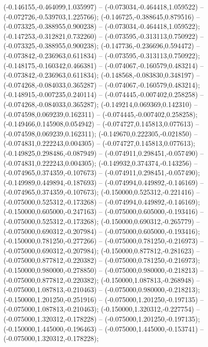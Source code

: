  (-0.146155,-0.464099,1.035997) -- (-0.073034,-0.464418,1.059522) -- (-0.072726,-0.539703,1.225766);
 (-0.146725,-0.388645,0.879516) -- (-0.073325,-0.388955,0.900238) -- (-0.073034,-0.464418,1.059522);
 (-0.147253,-0.312821,0.732260) -- (-0.073595,-0.313113,0.750922) -- (-0.073325,-0.388955,0.900238);
 (-0.147736,-0.236696,0.594472) -- (-0.073842,-0.236963,0.611834) -- (-0.073595,-0.313113,0.750922);
 (-0.148175,-0.160342,0.466381) -- (-0.074067,-0.160579,0.483214) -- (-0.073842,-0.236963,0.611834);
 (-0.148568,-0.083830,0.348197) -- (-0.074268,-0.084033,0.365287) -- (-0.074067,-0.160579,0.483214);
 (-0.148915,-0.007235,0.240114) -- (-0.074445,-0.007402,0.258258) -- (-0.074268,-0.084033,0.365287);
 (-0.149214,0.069369,0.142310) -- (-0.074598,0.069239,0.162311) -- (-0.074445,-0.007402,0.258258);
 (-0.149466,0.145908,0.054942) -- (-0.074727,0.145813,0.077613) -- (-0.074598,0.069239,0.162311);
 (-0.149670,0.222305,-0.021850) -- (-0.074831,0.222243,0.004305) -- (-0.074727,0.145813,0.077613);
 (-0.149825,0.298486,-0.087949) -- (-0.074911,0.298451,-0.057490) -- (-0.074831,0.222243,0.004305);
 (-0.149932,0.374374,-0.143256) -- (-0.074965,0.374359,-0.107673) -- (-0.074911,0.298451,-0.057490);
 (-0.149989,0.449894,-0.187693) -- (-0.074994,0.449892,-0.146169) -- (-0.074965,0.374359,-0.107673);
 (-0.150000,0.525312,-0.221416) -- (-0.075000,0.525312,-0.173268) -- (-0.074994,0.449892,-0.146169);
 (-0.150000,0.605000,-0.247163) -- (-0.075000,0.605000,-0.193416) -- (-0.075000,0.525312,-0.173268);
 (-0.150000,0.690312,-0.265779) -- (-0.075000,0.690312,-0.207984) -- (-0.075000,0.605000,-0.193416);
 (-0.150000,0.781250,-0.277266) -- (-0.075000,0.781250,-0.216973) -- (-0.075000,0.690312,-0.207984);
 (-0.150000,0.877812,-0.281623) -- (-0.075000,0.877812,-0.220382) -- (-0.075000,0.781250,-0.216973);
 (-0.150000,0.980000,-0.278850) -- (-0.075000,0.980000,-0.218213) -- (-0.075000,0.877812,-0.220382);
 (-0.150000,1.087813,-0.268948) -- (-0.075000,1.087813,-0.210463) -- (-0.075000,0.980000,-0.218213);
 (-0.150000,1.201250,-0.251916) -- (-0.075000,1.201250,-0.197135) -- (-0.075000,1.087813,-0.210463);
 (-0.150000,1.320312,-0.227754) -- (-0.075000,1.320312,-0.178228) -- (-0.075000,1.201250,-0.197135);
 (-0.150000,1.445000,-0.196463) -- (-0.075000,1.445000,-0.153741) -- (-0.075000,1.320312,-0.178228);
